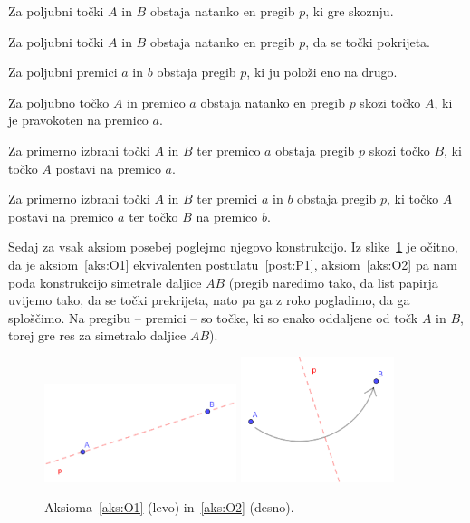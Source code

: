 \begin{aksiom}
    \label{aks:O1}
    Za poljubni točki $A$ in $B$ obstaja natanko en pregib $p$, ki gre skoznju.
\end{aksiom}
\begin{aksiom}
    \label{aks:O2}
    Za poljubni točki $A$ in $B$ obstaja natanko en pregib $p$, da se točki pokrijeta.
\end{aksiom}
\begin{aksiom}
    \label{aks:O3}
    Za poljubni premici $a$ in $b$ obstaja pregib $p$, ki ju položi eno na drugo.
\end{aksiom}
\begin{aksiom}
    \label{aks:O4}
    Za poljubno točko $A$ in premico $a$ obstaja natanko en pregib $p$ skozi točko $A$, ki je pravokoten na premico $a$.
\end{aksiom}
\begin{aksiom}
    \label{aks:O5}
    Za primerno izbrani točki $A$ in $B$ ter premico $a$ obstaja pregib $p$ skozi točko $B$, ki točko $A$ postavi na premico $a$.
\end{aksiom}
\begin{aksiom}
    \label{aks:O6}
    Za primerno izbrani točki $A$ in $B$ ter premici $a$ in $b$ obstaja pregib $p$, ki točko $A$ postavi na premico $a$ ter točko $B$ na premico $b$.
\end{aksiom}

Sedaj za vsak aksiom posebej poglejmo njegovo konstrukcijo. Iz slike~\ref{fig:O1_in_O2} je očitno, da je aksiom~\ref{aks:O1} ekvivalenten postulatu~\ref{post:P1}, aksiom~\ref{aks:O2} pa nam poda konstrukcijo simetrale daljice $AB$ (pregib naredimo tako, da list papirja uvijemo tako, da se točki prekrijeta, nato pa ga z roko pogladimo, da ga sploščimo. Na pregibu -- premici -- so točke, ki so enako oddaljene od točk $A$ in $B$, torej gre res za simetralo daljice $AB$).

\begin{figure}[h]
    \centering
    \includegraphics[width=0.5\textwidth]{images/origami_aksiomi/O1.png}
    \includegraphics[width=0.4\textwidth]{images/origami_aksiomi/O2.png}
    \caption[Aksioma~\ref{aks:O1} in~\ref{aks:O2}]{Aksioma~\ref{aks:O1} (levo) in~\ref{aks:O2} (desno).}
    \label{fig:O1_in_O2}
\end{figure}


